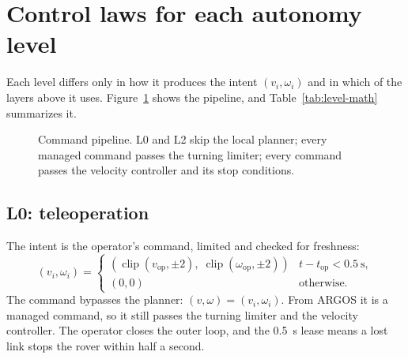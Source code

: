 \section{Control laws for each autonomy level}
\label{sec:auto-levels}

Each level differs only in how it produces the intent $(v_i, \omega_i)$ and in which of the layers above it uses.
Figure~\ref{fig:pipeline} shows the pipeline, and Table~\ref{tab:level-math} summarizes it.

\begin{figure}[ht]
\centering
{}
\caption{Command pipeline. L0 and L2 skip the local planner; every managed command passes the turning limiter; every command passes the velocity controller and its stop conditions.}
\label{fig:pipeline}
\end{figure}

\subsection{L0: teleoperation}

The intent is the operator's command, limited and checked for freshness:
\begin{equation}
  (v_i, \omega_i) = \begin{cases} \left(\operatorname{clip}(v_{\text{op}}, \pm 2),\; \operatorname{clip}(\omega_{\text{op}}, \pm 2)\right) & t - t_{\text{op}} < 0.5~\text{s}, \\ (0, 0) & \text{otherwise.} \end{cases}
\end{equation}
The command bypasses the planner: $(v, \omega) = (v_i, \omega_i)$.
From ARGOS it is a managed command, so it still passes the turning limiter and the velocity controller.
The operator closes the outer loop, and the 0.5~s lease means a lost link stops the rover within half a second.

